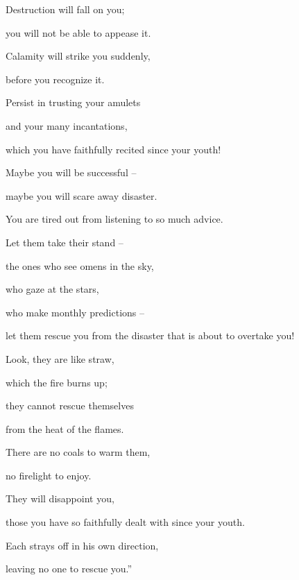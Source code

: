 {\par }{\Q Destruction
will fall
on
you;
\par }{\Q you will not
be able
to appease
it.
\par }{\Q Calamity
will strike
you suddenly,
\par }{\Q before you recognize it.
\par }{\Q {}Persist
in trusting
your amulets
\par }{\Q and your many
incantations,
\par }{\Q which
you have faithfully recited
since your youth!
\par }{\Q Maybe
you will be successful –
\par }{\Q maybe
you will scare away disaster.
\par }{\Q {}You are tired
out from listening to so much
advice.
\par }{\Q Let them take their stand
–
\par }{\Q the ones who see omens
in the sky,
\par }{\Q who gaze
at the stars,
\par }{\Q who make
monthly
predictions
–
\par }{\Q let them rescue
you from the disaster
that
is about to overtake you!
\par }{\Q {}Look,
they are like straw,
\par }{\Q which the fire
burns up;
\par }{\Q they cannot
rescue
themselves
\par }{\Q from the heat of the flames.
\par }{\Q There are no
coals
to warm
them,
\par }{\Q no firelight to enjoy.
\par }{\Q {}They will disappoint you,

\par }{\Q those you have so faithfully dealt
with since your youth.
\par }{\Q Each
strays off
in his own direction,
\par }{\Q leaving no one
to rescue you.”

}
